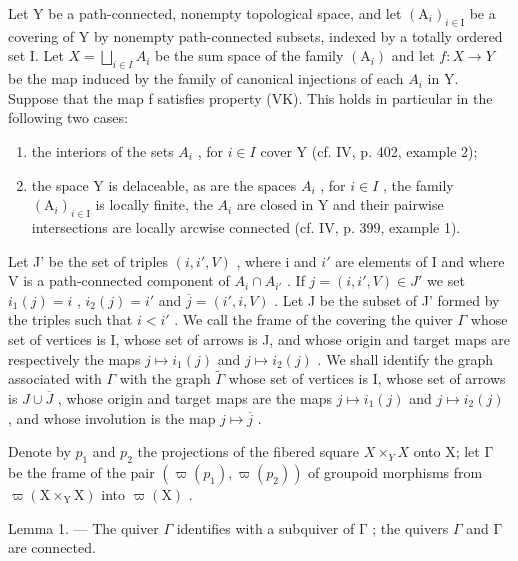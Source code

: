 Let Y be a path-connected, nonempty topological space, and let \((\mathrm{A}_{i})_{i\in\mathrm{I}}\) be a covering of Y by nonempty path-connected subsets, indexed by a totally ordered set I. Let \(X=\bigsqcup_{i\in I}A_{i}\) be the sum space of the family \((\mathrm{A}_{i})\) and let \(f:X\to Y\) be the map induced by the family of canonical injections of each \(A_{i}\) in Y. Suppose that the map f satisfies property (VK). This holds in particular in the following two cases:

\begin{enumerate}
\def\labelenumi{(\roman{enumi})}
\item
  the interiors of the sets \(A_{i}\) , for \(i \in I\) cover Y (cf. IV, p. 402, example 2);
\item
  the space Y is delaceable, as are the spaces \(A_{i}\) , for \(i \in I\) , the family \((\mathrm{A}_{i})_{i \in \mathrm{I}}\) is locally finite, the \(A_{i}\) are closed in Y and their pairwise intersections are locally arcwise connected (cf. IV, p. 399, example 1).
\end{enumerate}

Let J' be the set of triples \((i, i', V)\) , where i and \(i'\) are elements of I and where V is a path-connected component of \(A_i \cap A_{i'}\) . If \(j = (i, i', V) \in J'\) we set \(i_1(j) = i\) , \(i_2(j) = i'\) and \(\overline{j} = (i', i, V)\) . Let J be the subset of J' formed by the triples such that \(i < i'\) . We call the frame of the covering the quiver \(\Gamma\) whose set of vertices is I, whose set of arrows is J, and whose origin and target maps are respectively the maps \(j \mapsto i_1(j)\) and \(j \mapsto i_2(j)\) . We shall identify the graph associated with \(\Gamma\) with the graph \(\widetilde{\Gamma}\) whose set of vertices is I, whose set of arrows is \(J \cup \overline{J}\) , whose origin and target maps are the maps \(j \mapsto i_{1}(j)\) and \(j \mapsto i_{2}(j)\) , and whose involution is the map \(j \mapsto \overline{j}\) .

Denote by \(p_1\) and \(p_2\) the projections of the fibered square \(X \times_{Y} X\) onto X; let \(\textsf{Γ}\) be the frame of the pair \((\varpi(p_1), \varpi(p_2))\) of groupoid morphisms from \(\varpi(\mathrm{X} \times_{\mathrm{Y}} \mathrm{X})\) into \(\varpi(\mathrm{X})\) .

Lemma 1. --- The quiver \(\Gamma\) identifies with a subquiver of \(\textsf{Γ}\) ; the quivers \(\Gamma\) and \(\textsf{Γ}\) are connected.


